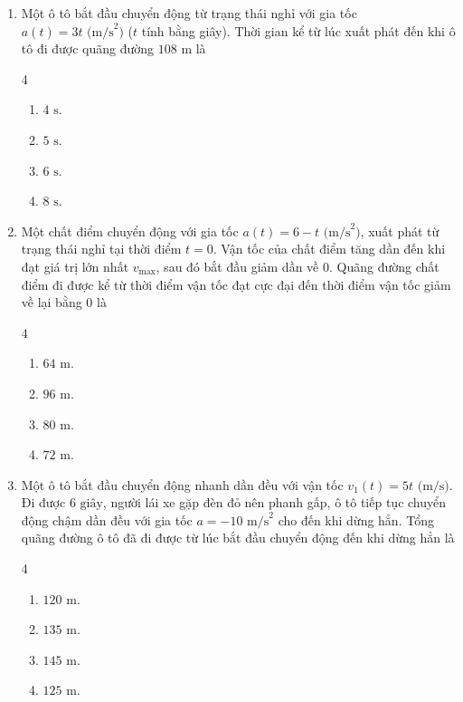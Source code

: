 \documentclass[12pt]{article}
\begin{document}
\begin{enumerate}[label=\textbf{Câu \arabic*.}]
		\item Một ô tô bắt đầu chuyển động từ trạng thái nghỉ với gia tốc $a(t) = 3t\text{ (m/s}^2\text{)}$ ($t$ tính bằng giây). Thời gian kể từ lúc xuất phát đến khi ô tô đi được quãng đường $108\text{ m}$ là
		\begin{multicols}{4}
			\begin{enumerate}[label=\textbf{\Alph*.}]
				\item $4\text{ s}$.
				\item $5\text{ s}$.
				\item $6\text{ s}$.
				\item $8\text{ s}$.
			\end{enumerate}
		\end{multicols}
		
		\item Một chất điểm chuyển động với gia tốc $a(t) = 6 - t\text{ (m/s}^2\text{)}$, xuất phát từ trạng thái nghỉ tại thời điểm $t = 0$. Vận tốc của chất điểm tăng dần đến khi đạt giá trị lớn nhất $v_{\max}$, sau đó bắt đầu giảm dần về $0$. Quãng đường chất điểm đi được kể từ thời điểm vận tốc đạt cực đại đến thời điểm vận tốc giảm về lại bằng $0$ là
		\begin{multicols}{4}
			\begin{enumerate}[label=\textbf{\Alph*.}]
				\item $64\text{ m}$.
				\item $96\text{ m}$.
				\item $80\text{ m}$.
				\item $72\text{ m}$.
			\end{enumerate}
		\end{multicols}
		
		\item Một ô tô bắt đầu chuyển động nhanh dần đều với vận tốc $v_1(t) = 5t\text{ (m/s)}$. Đi được $6\text{ giây}$, người lái xe gặp đèn đỏ nên phanh gấp, ô tô tiếp tục chuyển động chậm dần đều với gia tốc $a = -10\text{ m/s}^2$ cho đến khi dừng hẳn. Tổng quãng đường ô tô đã đi được từ lúc bắt đầu chuyển động đến khi dừng hẳn là
		\begin{multicols}{4}
			\begin{enumerate}[label=\textbf{\Alph*.}]
				\item $120\text{ m}$.
				\item $135\text{ m}$.
				\item $145\text{ m}$.
				\item $125\text{ m}$.
			\end{enumerate}
		\end{multicols}
		

\end{enumerate}
\end{document}
